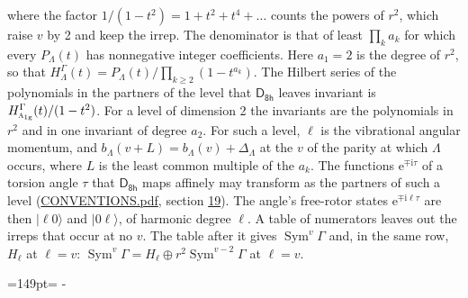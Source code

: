 \documentclass[10pt,a4paper]{article}
\newcommand{\needspace}[1]{\par\penalty-100\begingroup\dimen0=#1\relax\dimen2=\pagegoal
  \advance\dimen2-\pagetotal\ifdim\dimen0>\dimen2\relax\ifdim\dimen2>0pt\vfil\break\fi\fi
  \endgroup}
\numberwithin{equation}{section}
\newcommand{\grp}[1]{\mathsf{#1}}
\newcommand{\irr}[1]{\text{\normalfont\scshape #1}}
\newcommand{\ptag}[1]{\mathrm{#1}}
\newcommand{\iunit}{\mathrm{i}}
\newcommand{\expe}{\mathrm{e}}
\newcommand{\occ}[1]{\lvert #1\rangle}
\begin{document}
where the factor $1/(1 - t^2) = 1 + t^2 + t^4 + \dots$ counts the powers of $r^2$, which raise $v$ by 2 and keep the irrep. The denominator is that of least $\prod_k a_k$ for which every $P_\Lambda(t)$ has nonnegative integer coefficients. Here $a_1 = 2$ is the degree of $r^2$, so that $H^{\Gamma}_\Lambda(t) = P_\Lambda(t)/\prod_{k\ge2}(1 - t^{a_k})$. The Hilbert series of the polynomials in the partners of the level that $\grp{D_{8h}}$ leaves invariant is $H^{\Gamma}_{\irr{a}_{1\ptag{g}}}(t)/(1 - t^2)$. For a level of dimension 2 the invariants are the polynomials in $r^2$ and in one invariant of degree $a_2$. \label{n:index.overtone.period}\label{n:index.increment.unitary}For such a level, $\ell$ is the vibrational angular momentum, and $b_\Lambda(v + L) = b_\Lambda(v) + \Delta_\Lambda$ at the $v$ of the parity at which $\Lambda$ occurs, where $L$ is the least common multiple of the $a_k$. \label{n:local.torsion.angle}The functions $\expe^{\mp\iunit\tau}$ of a torsion angle $\tau$ that $\grp{D_{8h}}$ maps affinely may transform as the partners of such a level (\href{../../CONVENTIONS.pdf}{CONVENTIONS.pdf}, section \href{../../CONVENTIONS.pdf\#conv.19}{19}). The angle's free-rotor states $\expe^{\mp\iunit\ell\tau}$ are then $\occ{\ell 0}$ and $\occ{0 \ell}$, of harmonic degree $\ell$. A table of numerators leaves out the irreps that occur at no $v$. The table after it gives $\operatorname{Sym}^{v}\Gamma$ and, in the same row, $H_\ell$ at $\ell = v$: $\operatorname{Sym}^{v}\Gamma = H_\ell \oplus r^2\operatorname{Sym}^{v-2}\Gamma$ at $\ell = v$.
\needspace{149pt}
\end{document}
